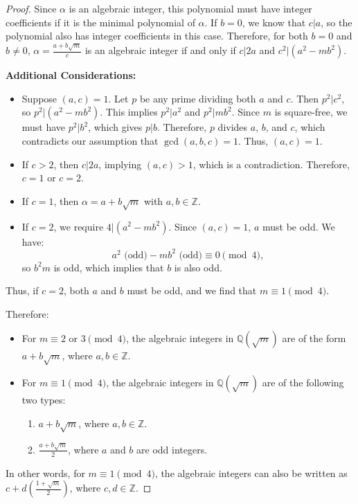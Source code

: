 \documentclass{article}
\begin{document}
\begin{proof}
Since \( \alpha \) is an algebraic integer, this polynomial must have integer coefficients if it is the minimal polynomial of \( \alpha \). If \( b = 0 \), we know that \( c | a \), so the polynomial also has integer coefficients in this case. Therefore, for both \( b = 0 \) and \( b \neq 0 \), \( \alpha = \frac{a + b\sqrt{m}}{c} \) is an algebraic integer if and only if \( c | 2a \) and \( c^2 | (a^2 - m b^2) \).

\vspace{0.5em}
\noindent \textbf{Additional Considerations:}
\begin{itemize}
    \item Suppose \( (a, c) = 1 \). Let \( p \) be any prime dividing both \( a \) and \( c \). Then \( p^2 | c^2 \), so \( p^2 | (a^2 - m b^2) \). This implies \( p^2 | a^2 \) and \( p^2 | m b^2 \). Since \( m \) is square-free, we must have \( p^2 | b^2 \), which gives \( p | b \). Therefore, \( p \) divides \( a \), \( b \), and \( c \), which contradicts our assumption that \( \gcd(a, b, c) = 1 \). Thus, \( (a, c) = 1 \).

    \item If \( c > 2 \), then \( c | 2a \), implying \( (a, c) > 1 \), which is a contradiction. Therefore, \( c = 1 \) or \( c = 2 \).
\end{itemize}

\noindent 
\begin{itemize}
    \item If \( c = 1 \), then \( \alpha = a + b\sqrt{m} \) with \( a, b \in \mathbb{Z} \).
    \item If \( c = 2 \), we require \( 4 | (a^2 - m b^2) \). Since \( (a, c) = 1 \), \( a \) must be odd. We have:
    \[
    a^2 \text{ (odd)} - m b^2 \text{ (odd)} \equiv 0 \pmod{4},
    \]
    so \( b^2 m \) is odd, which implies that \( b \) is also odd.
\end{itemize}

Thus, if \( c = 2 \), both \( a \) and \( b \) must be odd, and we find that \( m \equiv 1 \pmod{4} \).

\vspace{0.5em}
Therefore:
\begin{itemize}
    \item For \( m \equiv 2 \text{ or } 3 \pmod{4} \), the algebraic integers in \( \mathbb{Q}(\sqrt{m}) \) are of the form \( a + b\sqrt{m} \), where \( a, b \in \mathbb{Z} \).
    \item For \( m \equiv 1 \pmod{4} \), the algebraic integers in \( \mathbb{Q}(\sqrt{m}) \) are of the following two types:
    \begin{enumerate}
        \item \( a + b\sqrt{m} \), where \( a, b \in \mathbb{Z} \).
        \item \( \frac{a + b\sqrt{m}}{2} \), where \( a \) and \( b \) are odd integers.
    \end{enumerate}
\end{itemize}

In other words, for \( m \equiv 1 \pmod{4} \), the algebraic integers can also be written as \( c + d \left(\frac{1 + \sqrt{m}}{2}\right) \), where \( c, d \in \mathbb{Z} \).
\end{proof}
\end{document}
